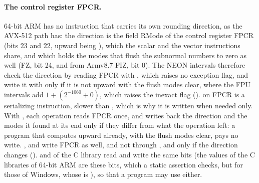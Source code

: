 \paragraph{The control register FPCR.} 64-bit ARM has no instruction that
carries its own rounding direction, as the AVX-512 path has: the direction is
the field RMode of the control register FPCR (bits 23 and 22, upward being
), which the scalar and the vector instructions share, and
which holds the modes that flush the subnormal numbers to zero as well (FZ,
bit 24, and from Armv8.7 FIZ, bit 0). The NEON intervals therefore check the
direction by reading FPCR with , which raises no exception flag, and
write it with  only if it is not upward with the flush modes clear,
where the FPU intervals add $1+(2^{-1060}+0)$, which raises the inexact flag
().  on FPCR is a serializing instruction,
slower than , which is why it is written when needed only. With
, each operation reads FPCR once, and writes
back the direction and the modes it found at its end only if they differ from
what the operation left: a program that computes upward already, with the
flush modes clear, pays no write. ,
 and  write FPCR as well, and
not through , and only if the direction changes
().  and  of the C
library read and write the same bits (the  values of the C
libraries of 64-bit ARM are these bits, which a static assertion checks, but
for those of Windows, whose  is ), so that a
program may use either.

\medskip

